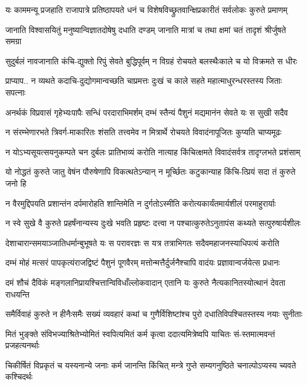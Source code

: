 \twolineshloka
{यः काममन्यू प्रजहाति राजापात्रे प्रतिष्ठापयते धनं च}
{विशेषविच्छ्रुतवान्क्षिप्रकारीतं सर्वलोकः कुरुते प्रमाणम्}


\twolineshloka
{जानाति विश्वासयितुं मनुष्यान्विज्ञातदोषेषु दधाति दण्डम्}
{जानाति मात्रां च तथा क्षमां चतं तादृशं श्रीर्जुषते समग्रा}


\twolineshloka
{सुदुर्बलं नावजानाति कंचि-द्युक्तो रिपुं सेवते बुद्धिपूर्वम्}
{न विग्रहं रोचयते बलस्थैःकाले च यो विक्रमते स धीरः}


\twolineshloka
{प्राप्याप.. न व्यथते कदाचि-दुद्योगमान्वच्छति चाप्रमत्तः}
{दुःखं च काले सहते महात्माधुरन्धरस्तस्य जिताः सपत्नाः}


\twolineshloka
{अनर्थकं विप्रवासं गृहेभ्यःपापैः सन्धिं परदाराभिमर्शम्}
{दम्भं स्तैन्यं पैशुनं मद्यमानंन सेवते यः स सुखी सदैव}


\twolineshloka
{न संरम्भेणारभते त्रिवर्ग-माकारितः शंसति तत्त्वमेव}
{न मित्रार्थे रोचयते विवादंनापूजितः कुप्यति चाप्यमूढः}


\twolineshloka
{न योऽभ्यसूयत्सयनुकम्पते चन दुर्बलः प्रातिभाव्यं करोति}
{नात्याह किंचित्क्षमते विवादंसर्वत्र तादृग्लभते प्रशंसाम्}


\twolineshloka
{यो नोद्धतं कुरुते जातु वेषंन पौरुषेणापि विकत्थतेऽन्यान्}
{न मूर्च्छितः कटुकान्याह किंचि-त्प्रियं सदा तं कुरुते जनो हि}


\twolineshloka
{न वैरमुद्दिपयति प्रशान्तंन दर्पमारोहति शान्तिमेति}
{न दुर्गतोऽस्मीति करोत्यकार्यंतमार्यशीलं परमाहुरार्याः}


\twolineshloka
{न स्वे सुखे वै कुरुते प्रहर्षंनान्यस्य दुःखे भवति प्रहृष्टः}
{दत्त्वा न पश्चात्कुरुतेऽनुतापंस कथ्यते सत्पुरुषार्यशीलः}


\twolineshloka
{देशाचारान्समयाञ्जातिधर्मान्बुभूषते यः स परावरज्ञः}
{स यत्र तत्राभिगतः सदैवमहाजनस्याधिपत्यं करोति}


\twolineshloka
{दम्भं मोहं मत्सरं पापकृत्यंराजद्विष्टं पैशुनं पूगवैरम्}
{मत्तोन्मत्तैर्दुर्जनैश्चापि वादंयः प्रज्ञावान्वर्जयेत्स प्रधानः}


\twolineshloka
{दमं शौचं दैविकं मङ्गलानिप्रायश्चित्तान्विविधाँल्लोकवादान्}
{एतानि यः कुरुते नैत्यकानितस्योत्थानं देवता राधयन्ति}


\twolineshloka
{समैर्विवाहं कुरुते न हीनैःसमैः सख्यं व्यवहारं कथां च}
{गुणैर्विशिष्टांश्च पुरो दधातिविपश्चितस्तस्य नयाः सुनीताः}


\twolineshloka
{मितं भुङ्क्ते संविभज्याश्रितेभ्योमितं स्वपित्यमितं कर्म कृत्वा}
{ददात्यमित्रेष्वपि याचितः सं-स्तमात्मवन्तं प्रजहत्यनर्थाः}


\twolineshloka
{चिकीर्षितं विप्रकृतं च यस्यनान्ये जनाः कर्म जानन्ति किंचित्}
{मन्त्रे गुप्ते सम्यगनुष्ठिते चनाल्पोऽप्यस्य च्यवते कश्चिदर्थः}


